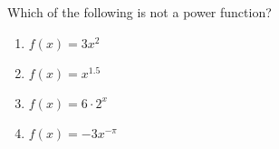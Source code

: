 \bigskip

\item Which of the following is not a power function?


\begin{enumerate}
\item $f(x)=3x^2$
\item $f(x)=x^{1.5}$
\item $f(x)=6\cdot2^x$
\item $f(x)=-3x^{-\pi}$
\end{enumerate}

